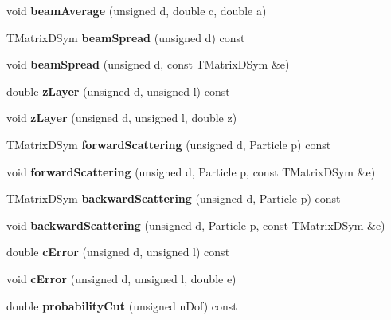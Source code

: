 \begin{DoxyCompactItemize}
\item 
void {\bfseries beamAverage} (unsigned d, double c, double a)\label{classTBTrack_1_1FitConstants_a973118ce9e89a90aaa0453ad2693dc41}

\item 
TMatrixDSym {\bfseries beamSpread} (unsigned d) const \label{classTBTrack_1_1FitConstants_a92a42dc3339b8d8812aaf9b3e96d757d}

\item 
void {\bfseries beamSpread} (unsigned d, const TMatrixDSym \&e)\label{classTBTrack_1_1FitConstants_ad904d24cd02a69767b6935e5a3131aa2}

\item 
double {\bfseries zLayer} (unsigned d, unsigned l) const \label{classTBTrack_1_1FitConstants_a48d3c08ed8a147b4fe34bb0671650fda}

\item 
void {\bfseries zLayer} (unsigned d, unsigned l, double z)\label{classTBTrack_1_1FitConstants_afb9283b46152570709ecf4e2ceba940a}

\item 
TMatrixDSym {\bfseries forwardScattering} (unsigned d, Particle p) const \label{classTBTrack_1_1FitConstants_a5d182698ad7f662247a7f9bf15662cd7}

\item 
void {\bfseries forwardScattering} (unsigned d, Particle p, const TMatrixDSym \&e)\label{classTBTrack_1_1FitConstants_a1ba9942b8faf3f662fd5002a9b2f9d29}

\item 
TMatrixDSym {\bfseries backwardScattering} (unsigned d, Particle p) const \label{classTBTrack_1_1FitConstants_aa2760e9bcaf3ca95fd18d111c2789544}

\item 
void {\bfseries backwardScattering} (unsigned d, Particle p, const TMatrixDSym \&e)\label{classTBTrack_1_1FitConstants_ae3c4ce5580e332d5bcf1c53077f130f7}

\item 
double {\bfseries cError} (unsigned d, unsigned l) const \label{classTBTrack_1_1FitConstants_aa59b427cb93906ae61d18515e656ea05}

\item 
void {\bfseries cError} (unsigned d, unsigned l, double e)\label{classTBTrack_1_1FitConstants_aaa2f3eef3f50ce8ef1c3be75268024c7}

\item 
double {\bfseries probabilityCut} (unsigned nDof) const \label{classTBTrack_1_1FitConstants_a05ec4b2aba5904d2ba510d5b237e740a}


\end{DoxyCompactItemize}
